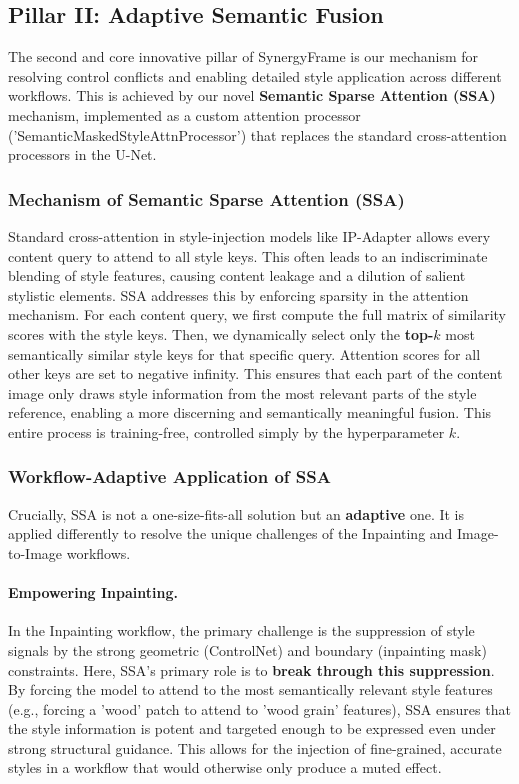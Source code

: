 \documentclass[letterpaper]{article} %
\begin{document}
\subsection{Pillar II: Adaptive Semantic Fusion}
\label{sec:fusion}

The second and core innovative pillar of SynergyFrame is our mechanism for resolving control conflicts and enabling detailed style application across different workflows. This is achieved by our novel \textbf{Semantic Sparse Attention (SSA)} mechanism, implemented as a custom attention processor ('SemanticMaskedStyleAttnProcessor') that replaces the standard cross-attention processors in the U-Net.

\subsubsection{Mechanism of Semantic Sparse Attention (SSA)}
Standard cross-attention in style-injection models like IP-Adapter allows every content query to attend to all style keys. This often leads to an indiscriminate blending of style features, causing content leakage and a dilution of salient stylistic elements. SSA addresses this by enforcing sparsity in the attention mechanism. For each content query, we first compute the full matrix of similarity scores with the style keys. Then, we dynamically select only the \textbf{top-$k$} most semantically similar style keys for that specific query. Attention scores for all other keys are set to negative infinity. This ensures that each part of the content image only draws style information from the most relevant parts of the style reference, enabling a more discerning and semantically meaningful fusion. This entire process is training-free, controlled simply by the hyperparameter $k$.

\subsubsection{Workflow-Adaptive Application of SSA}
Crucially, SSA is not a one-size-fits-all solution but an \textbf{adaptive} one. It is applied differently to resolve the unique challenges of the Inpainting and Image-to-Image workflows.

\paragraph{Empowering Inpainting.} In the Inpainting workflow, the primary challenge is the suppression of style signals by the strong geometric (ControlNet) and boundary (inpainting mask) constraints. Here, SSA's primary role is to \textbf{break through this suppression}. By forcing the model to attend to the most semantically relevant style features (e.g., forcing a 'wood' patch to attend to 'wood grain' features), SSA ensures that the style information is potent and targeted enough to be expressed even under strong structural guidance. This allows for the injection of fine-grained, accurate styles in a workflow that would otherwise only produce a muted effect.
\end{document}
